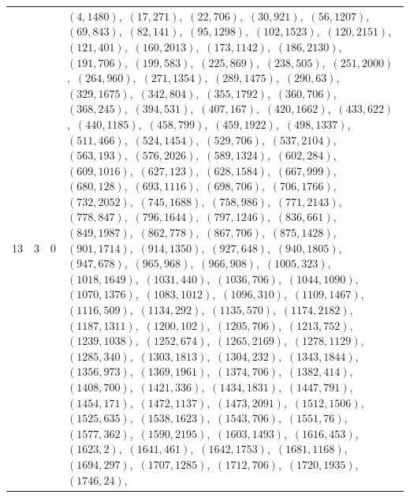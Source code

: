 \documentclass[11pt]{article}
\begin{document}
{\begin{longtable}{@{}rrl>{\raggedright\arraybackslash}p{}@{}}
13 & 3 & $0$ & $(4,1480)$,\allowbreak\ $(17,271)$,\allowbreak\ $(22,706)$,\allowbreak\ $(30,921)$,\allowbreak\ $(56,1207)$,\allowbreak\ $(69,843)$,\allowbreak\ $(82,141)$,\allowbreak\ $(95,1298)$,\allowbreak\ $(102,1523)$,\allowbreak\ $(120,2151)$,\allowbreak\ $(121,401)$,\allowbreak\ $(160,2013)$,\allowbreak\ $(173,1142)$,\allowbreak\ $(186,2130)$,\allowbreak\ $(191,706)$,\allowbreak\ $(199,583)$,\allowbreak\ $(225,869)$,\allowbreak\ $(238,505)$,\allowbreak\ $(251,2000)$,\allowbreak\ $(264,960)$,\allowbreak\ $(271,1354)$,\allowbreak\ $(289,1475)$,\allowbreak\ $(290,63)$,\allowbreak\ $(329,1675)$,\allowbreak\ $(342,804)$,\allowbreak\ $(355,1792)$,\allowbreak\ $(360,706)$,\allowbreak\ $(368,245)$,\allowbreak\ $(394,531)$,\allowbreak\ $(407,167)$,\allowbreak\ $(420,1662)$,\allowbreak\ $(433,622)$,\allowbreak\ $(440,1185)$,\allowbreak\ $(458,799)$,\allowbreak\ $(459,1922)$,\allowbreak\ $(498,1337)$,\allowbreak\ $(511,466)$,\allowbreak\ $(524,1454)$,\allowbreak\ $(529,706)$,\allowbreak\ $(537,2104)$,\allowbreak\ $(563,193)$,\allowbreak\ $(576,2026)$,\allowbreak\ $(589,1324)$,\allowbreak\ $(602,284)$,\allowbreak\ $(609,1016)$,\allowbreak\ $(627,123)$,\allowbreak\ $(628,1584)$,\allowbreak\ $(667,999)$,\allowbreak\ $(680,128)$,\allowbreak\ $(693,1116)$,\allowbreak\ $(698,706)$,\allowbreak\ $(706,1766)$,\allowbreak\ $(732,2052)$,\allowbreak\ $(745,1688)$,\allowbreak\ $(758,986)$,\allowbreak\ $(771,2143)$,\allowbreak\ $(778,847)$,\allowbreak\ $(796,1644)$,\allowbreak\ $(797,1246)$,\allowbreak\ $(836,661)$,\allowbreak\ $(849,1987)$,\allowbreak\ $(862,778)$,\allowbreak\ $(867,706)$,\allowbreak\ $(875,1428)$,\allowbreak\ $(901,1714)$,\allowbreak\ $(914,1350)$,\allowbreak\ $(927,648)$,\allowbreak\ $(940,1805)$,\allowbreak\ $(947,678)$,\allowbreak\ $(965,968)$,\allowbreak\ $(966,908)$,\allowbreak\ $(1005,323)$,\allowbreak\ $(1018,1649)$,\allowbreak\ $(1031,440)$,\allowbreak\ $(1036,706)$,\allowbreak\ $(1044,1090)$,\allowbreak\ $(1070,1376)$,\allowbreak\ $(1083,1012)$,\allowbreak\ $(1096,310)$,\allowbreak\ $(1109,1467)$,\allowbreak\ $(1116,509)$,\allowbreak\ $(1134,292)$,\allowbreak\ $(1135,570)$,\allowbreak\ $(1174,2182)$,\allowbreak\ $(1187,1311)$,\allowbreak\ $(1200,102)$,\allowbreak\ $(1205,706)$,\allowbreak\ $(1213,752)$,\allowbreak\ $(1239,1038)$,\allowbreak\ $(1252,674)$,\allowbreak\ $(1265,2169)$,\allowbreak\ $(1278,1129)$,\allowbreak\ $(1285,340)$,\allowbreak\ $(1303,1813)$,\allowbreak\ $(1304,232)$,\allowbreak\ $(1343,1844)$,\allowbreak\ $(1356,973)$,\allowbreak\ $(1369,1961)$,\allowbreak\ $(1374,706)$,\allowbreak\ $(1382,414)$,\allowbreak\ $(1408,700)$,\allowbreak\ $(1421,336)$,\allowbreak\ $(1434,1831)$,\allowbreak\ $(1447,791)$,\allowbreak\ $(1454,171)$,\allowbreak\ $(1472,1137)$,\allowbreak\ $(1473,2091)$,\allowbreak\ $(1512,1506)$,\allowbreak\ $(1525,635)$,\allowbreak\ $(1538,1623)$,\allowbreak\ $(1543,706)$,\allowbreak\ $(1551,76)$,\allowbreak\ $(1577,362)$,\allowbreak\ $(1590,2195)$,\allowbreak\ $(1603,1493)$,\allowbreak\ $(1616,453)$,\allowbreak\ $(1623,2)$,\allowbreak\ $(1641,461)$,\allowbreak\ $(1642,1753)$,\allowbreak\ $(1681,1168)$,\allowbreak\ $(1694,297)$,\allowbreak\ $(1707,1285)$,\allowbreak\ $(1712,706)$,\allowbreak\ $(1720,1935)$,\allowbreak\ $(1746,24)$,\allowbreak\ 
\end{longtable}}
\end{document}
